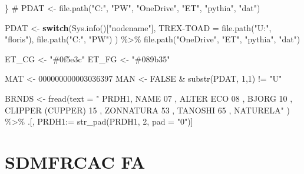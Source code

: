 \documentclass[
  american,
  10,
  a4paper,
]{book}
\newenvironment{Shaded}{\begin{snugshade}}{\end{snugshade}}
\newcommand{\AttributeTok}[1]{\textcolor[rgb]{0.40,0.45,0.13}{#1}}
\newcommand{\CommentTok}[1]{\textcolor[rgb]{0.37,0.37,0.37}{#1}}
\newcommand{\ConstantTok}[1]{\textcolor[rgb]{0.56,0.35,0.01}{#1}}
\newcommand{\ControlFlowTok}[1]{\textcolor[rgb]{0.00,0.23,0.31}{\textbf{#1}}}
\newcommand{\DecValTok}[1]{\textcolor[rgb]{0.68,0.00,0.00}{#1}}
\newcommand{\ErrorTok}[1]{\textcolor[rgb]{0.68,0.00,0.00}{#1}}
\newcommand{\FunctionTok}[1]{\textcolor[rgb]{0.28,0.35,0.67}{#1}}
\newcommand{\NormalTok}[1]{\textcolor[rgb]{0.00,0.23,0.31}{#1}}
\newcommand{\OtherTok}[1]{\textcolor[rgb]{0.00,0.23,0.31}{#1}}
\newcommand{\SpecialCharTok}[1]{\textcolor[rgb]{0.37,0.37,0.37}{#1}}
\newcommand{\StringTok}[1]{\textcolor[rgb]{0.13,0.47,0.30}{#1}}
\theoremstyle{definition}
\theoremstyle{remark}
\begin{document}
\begin{Shaded}
\begin{Highlighting}[]
\NormalTok{  \}}
\CommentTok{\# PDAT \textless{}{-} file.path("C:", "PW", "OneDrive", "ET", "pythia", "dat")}

\NormalTok{PDAT }\OtherTok{\textless{}{-}} 
  \ControlFlowTok{switch}\NormalTok{(}\FunctionTok{Sys.info}\NormalTok{()[}\StringTok{"nodename"}\NormalTok{],}
         \StringTok{\textquotesingle{}TREX{-}TOAD\textquotesingle{}} \OtherTok{=} \FunctionTok{file.path}\NormalTok{(}\StringTok{"U:"}\NormalTok{, }\StringTok{"floris"}\NormalTok{),}
                       \FunctionTok{file.path}\NormalTok{(}\StringTok{"C:"}\NormalTok{, }\StringTok{"PW"}\NormalTok{)}
\NormalTok{  ) }\SpecialCharTok{\%\textgreater{}\%} 
  \FunctionTok{file.path}\NormalTok{(}\StringTok{"OneDrive"}\NormalTok{, }\StringTok{"ET"}\NormalTok{, }\StringTok{"pythia"}\NormalTok{, }\StringTok{"dat"}\NormalTok{)}

\NormalTok{ET\_CG }\OtherTok{\textless{}{-}} \StringTok{"\#0f5e3c"}
\NormalTok{ET\_FG }\OtherTok{\textless{}{-}} \StringTok{"\#089b35"}

\NormalTok{MAT }\OtherTok{\textless{}{-}} \StringTok{\textquotesingle{}000000000003036397\textquotesingle{}}
\NormalTok{MAN }\OtherTok{\textless{}{-}} \ConstantTok{FALSE} \SpecialCharTok{\&} \FunctionTok{substr}\NormalTok{(PDAT, }\DecValTok{1}\NormalTok{,}\DecValTok{1}\NormalTok{) }\SpecialCharTok{!=} \StringTok{"U"}

\NormalTok{BRNDS }\OtherTok{\textless{}{-}} 
  \FunctionTok{fread}\NormalTok{(}\AttributeTok{text =} \StringTok{"}
\StringTok{  PRDH1, NAME}
\StringTok{  07   , ALTER ECO}
\StringTok{  08   , BJORG}
\StringTok{  10   , CLIPPER (CUPPER)}
\StringTok{  15   , ZONNATURA}
\StringTok{  53   , TANOSHI}
\StringTok{  65   , NATURELA"}
\NormalTok{  ) }\SpecialCharTok{\%\textgreater{}\%}
\NormalTok{  .[, PRDH1}\SpecialCharTok{:}\ErrorTok{=} \FunctionTok{str\_pad}\NormalTok{(PRDH1, }\DecValTok{2}\NormalTok{, }\AttributeTok{pad =} \StringTok{"0"}\NormalTok{)]}
\end{Highlighting}
\end{Shaded}

\section{SDMFRCAC FA}\label{sdmfrcac-fa}
\end{document}

